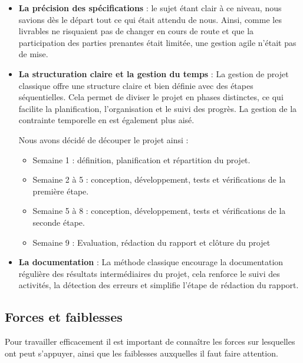 \documentclass[a4paper, 12pt]{report}
\begin{document}
\begin{itemize}
    \item \textbf{La précision des spécifications} : le sujet étant clair à ce niveau, nous savions dès le départ tout ce qui était attendu de nous. Ainsi, comme les livrables ne risquaient pas de changer en cours de route et que la participation des parties prenantes était limitée, une gestion agile n'était pas de mise.
          \bigskip

    \item \textbf{La structuration claire et la gestion du temps} : La gestion de projet classique offre une structure claire et bien définie avec des étapes séquentielles. Cela permet de diviser le projet en phases distinctes, ce qui facilite la planification, l'organisation et le suivi des progrès. La gestion de la contrainte temporelle en est également plus aisé.
          \bigskip

          Nous avons décidé de découper le projet ainsi :
          \begin{itemize}
              \item Semaine 1 : définition, planification et répartition du projet.
              \item Semaine 2 à 5 : conception, développement, tests et vérifications de la première étape.
              \item Semaine 5 à 8 : conception, développement, tests et vérifications de la seconde étape.
              \item Semaine 9 : Evaluation, rédaction du rapport et clôture du projet
          \end{itemize}
          \bigskip

    \item \textbf{La documentation} : La méthode classique encourage la documentation régulière des résultats intermédiaires du projet, cela renforce le suivi des activités, la détection des erreurs et simplifie l'étape de rédaction du rapport.
\end{itemize}

\subsection{Forces et faiblesses}

Pour travailler efficacement il est important de connaître les forces sur lesquelles ont peut s'appuyer, ainsi que les faiblesses auxquelles il faut faire attention.
\bigskip
\end{document}
